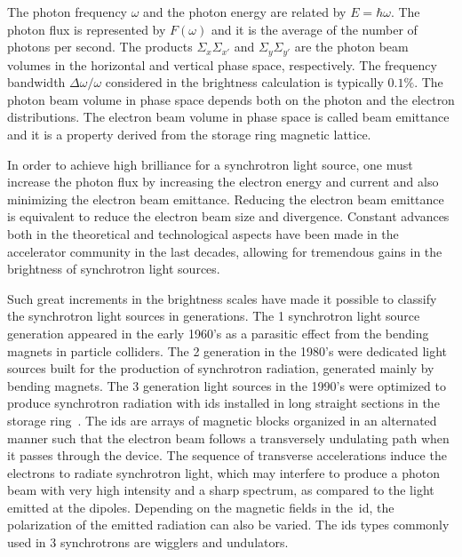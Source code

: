 The photon frequency $\omega$ and the photon energy are related by $E = \hbar \omega$. The photon flux is represented by $F(\omega)$ and it is the average of the number of photons per second. The products $\Sigma_x \Sigma_{x'}$ and $\Sigma_y\Sigma_{y'}$ are the photon beam volumes in the horizontal and vertical phase space, respectively. The frequency bandwidth $\Delta \omega/\omega$ considered in the brightness calculation is typically $0.1\%$. The photon beam volume in phase space depends both on the photon and the electron distributions. The electron beam volume in phase space is called beam emittance and it is a property derived from the storage ring magnetic lattice.

In order to achieve high brilliance for a synchrotron light source, one must increase the photon flux by increasing the electron energy and current and also minimizing the electron beam emittance. Reducing the electron beam emittance is equivalent to reduce the electron beam size and divergence. Constant advances both in the theoretical and technological aspects have been made in the accelerator community in the last decades, allowing for tremendous gains in the brightness of synchrotron light sources\cite{eriksson, liu2017}. 

Such great increments in the brightness scales have made it possible to classify the synchrotron light sources in generations. The 1 synchrotron light source generation appeared in the early 1960's as a parasitic effect from the bending magnets in particle colliders. The 2 generation in the 1980's were dedicated light sources built for the production of synchrotron radiation, generated mainly by bending magnets. The 3 generation light sources in the 1990's were optimized to produce synchrotron radiation with \glspl{id} installed in long straight sections in the storage ring~\cite{liu2017}. The \glspl{id} are arrays of magnetic blocks organized in an alternated manner such that the electron beam follows a transversely undulating path when it passes through the device. The sequence of transverse accelerations induce the electrons to radiate synchrotron light, which may interfere to produce a photon beam with very high intensity and a sharp spectrum, as compared to the light emitted at the dipoles. Depending on the magnetic fields in the~\gls{id}, the polarization of the emitted radiation can also be varied. The \glspl{id} types commonly used in 3 synchrotrons are wigglers and undulators.

